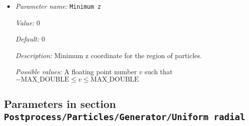 \begin{itemize}
{\it Value:} 0


{\it Default:} 0


{\it Description:} Minimum y coordinate for the region of particles.


{\it Possible values:} A floating point number $v$ such that $-\text{MAX\_DOUBLE} \leq v \leq \text{MAX\_DOUBLE}$
\item {\it Parameter name:} {\tt Minimum z}
\label{parameters:Postprocess/Particles/Generator/Uniform box/Minimum z}


{\it Value:} 0


{\it Default:} 0


{\it Description:} Minimum z coordinate for the region of particles.


{\it Possible values:} A floating point number $v$ such that $-\text{MAX\_DOUBLE} \leq v \leq \text{MAX\_DOUBLE}$
\end{itemize}

\subsection{Parameters in section \tt Postprocess/Particles/Generator/Uniform radial}
\label{parameters:Postprocess/Particles/Generator/Uniform_20radial}

